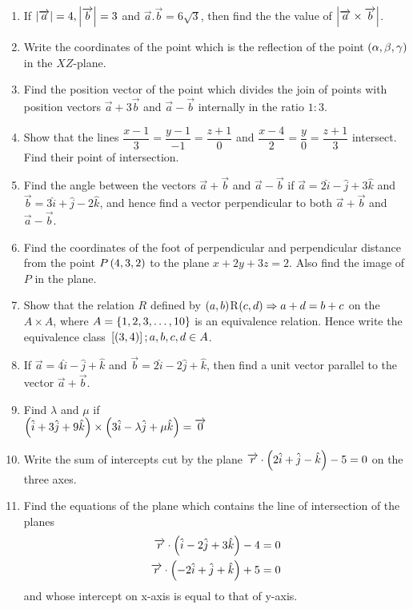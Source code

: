 \begin{enumerate}
	\item If $\left\vert\overrightarrow{a}\right\vert = 4, \left\vert\overrightarrow{b}\right\vert = 3$ and $ \overrightarrow{a}.\overrightarrow{b} = 6\sqrt{3}$, then find the the value of $\left\vert\overrightarrow{a}\times \overrightarrow{b}\right\vert$.
	\item Write the coordinates of the point which is the reflection of the point $\left(\alpha,\beta,\gamma\right)$ in the $XZ$-plane.
	\item Find the position vector of the point which divides the join of points with position vectors $\overrightarrow{a} + 3\overrightarrow{b}$ and $\overrightarrow{a} - \overrightarrow{b}$ internally in the ratio $1:3$.
	\item Show that the lines $\dfrac{x-1}{3} = \dfrac{y-1}{-1} = \dfrac{z+1}{0}$ and $ \dfrac{x-4}{2} = \dfrac{y}{0} = \dfrac{z+1}{3}$ intersect. Find their point of intersection.
	\item Find the angle between the vectors $ \overrightarrow{a} + \overrightarrow{b} $ and $ \overrightarrow{a} - \overrightarrow{b} $ if $ \overrightarrow{a} = 2\hat{i} - \hat{j} +3\hat{k} $ and $ \overrightarrow{b} = 3\hat{i} + \hat{j} - 2\hat{k}$, and hence find a vector perpendicular to both $ \overrightarrow{a} + \overrightarrow{b} $ and $\overrightarrow{a} - \overrightarrow{b}$.
	\item Find the coordinates of the foot of perpendicular and perpendicular distance from the point $P\left(4,3,2\right)$ to the plane $x + 2y + 3z = 2$. Also find the image of $P$ in the plane.
	\item Show that the relation $R$ defined by $\left(a,b\right)$R$\left(c,d\right) \Rightarrow a + d = b + c$ on the $A\times A$, where $A = \left\{1,2,3,\ldots,10\right\}$ is an equivalence relation. Hence write the equivalence class ${}\left[\left(3,4\right)\right]; a,b,c,d \in A$.
 
\item If $\overrightarrow{a} = 4\hat{i} -\hat{j} + \hat{k}$ and $\overrightarrow{b} = 2\hat{i} -2\hat{j} + \hat{k} $, then find a unit vector parallel to the vector $\overrightarrow{a} + \overrightarrow{b} $.

\item Find $\lambda$ and $\mu$ if\\
$\left(\hat{i} + 3\hat{j} + 9\hat{k}\right)\times\left(3\hat{i} - \lambda\hat{j} + \mu\hat{k}\right) = \overrightarrow{0}$

\item Write the sum of intercepts cut by the plane $\overrightarrow{r}\cdot\left(2\hat{i} + \hat{j} - \hat{k}\right) - 5 = 0$ on the three axes.

\item Find the equations of the plane which contains the line of intersection of the planes
\begin{align*}
	\overrightarrow{r}\cdot\left(\hat{i} -2\hat{j} + 3\hat{k}\right)-4&=0\\
\overrightarrow{r}\cdot\left(-2\hat{i} + \hat{j} + \hat{k}\right)+5&=0 
\end{align*}
and whose intercept on x-axis is equal to that of y-axis.

\end{enumerate}
